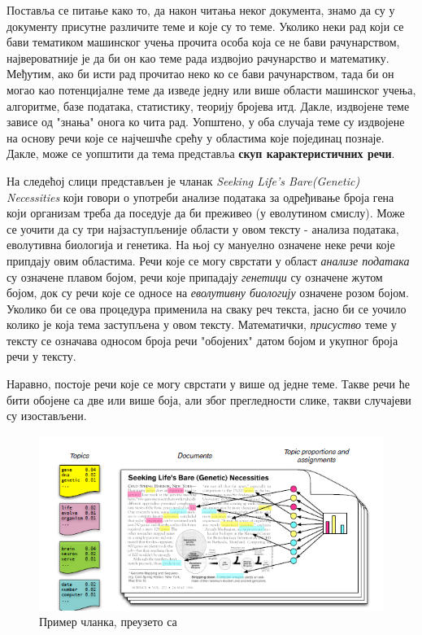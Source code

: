 Поставља се питање како то, да након читања неког документа, знамо да су у документу присутне различите теме и које су то теме. Уколико неки рад који се бави тематиком машинског учења прочита особа која се не бави рачунарством, највероватније је да би он као теме рада издвојио рачунарство и математику. Међутим, ако би исти рад прочитао неко ко се бави рачунарством, тада би он могао као потенцијалне теме да изведе једну или више области машинског учења, алгоритме, базе података, статистику, теорију бројева итд. Дакле, издвојене теме зависе од "знања" онога ко чита рад. Уопштено, у оба случаја теме су издвојене на основу речи које се најчешчће срећу у областима које појединац познаје. Дакле, може се уопштити да тема представља \textbf{скуп карактеристичних речи}. 

На следећој слици представљен је чланак \textit{Seeking Life's Bare(Genetic) Necessities} који говори о употреби анализе података за одређивање броја гена који организам треба да поседује да би преживео (у еволутином смислу). Може се уочити да су три најзаступљеније области у овом тексту - анализа података, еволутивна биологија  и генетика. На њој су мануелно означене неке речи које припдају овим областима. Речи које се могу сврстати у област \textit{анализе података} су означене плавом бојом, речи које припадају \textit{генетици} су означене жутом бојом, док су речи које се односе на \textit{еволутивну биологију} означене розом бојом. Уколико би се ова процедура применила на сваку реч текста, јасно би се уочило колико је која тема  заступљена у овом тексту. Математички, \textit{присуство} теме у тексту се означава односом  броја речи "обојених" датом бојом и укупног броја речи у тексту.

Наравно, постоје речи које се могу сврстати у више од једне теме. Такве речи ће бити обојене са две или више боја, али због прегледности слике, такви случајеви су изостављени.

\begin{figure}
    \centering
   \includegraphics[scale=0.9]{./Slike/slika1.png} 
	\caption{Пример чланка, преузето са \cite{blei1}}
	\label{fig:slika1}
\end{figure}

